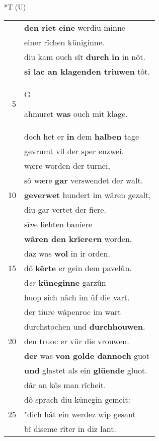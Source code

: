 \documentclass[8pt,a4paper,notitlepage]{article}
\begin{document}
\begin{table}[ht]
\begin{minipage}[t]{0.5\linewidth}
\end{minipage}
\hspace{0.5cm}
\begin{minipage}[t]{0.5\linewidth}
\small
\begin{center}*T (U)
\end{center}
\begin{tabular}{rl}
 & \textbf{den riet} \textbf{eine} werdiu minne\\ 
 & einer rîchen küniginne.\\ 
 & diu kam ouch sît \textbf{durch} \textbf{in} in nôt.\\ 
 & \textbf{si lac an klagenden triuwen} tôt.\\ 
5 & \begin{large}G\end{large}ahmuret \textbf{was} ouch mit klage.\\ 
 & doch het er \textbf{in} dem \textbf{halben} tage\\ 
 & gevrumt vil der sper enzwei.\\ 
 & wære worden der turnei,\\ 
 & sô wære \textbf{gar} verswendet der walt.\\ 
10 & \textbf{geverwet} hundert im wâren gezalt,\\ 
 & diu gar vertet der fiere.\\ 
 & sî\textit{n}e liehten baniere\\ 
 & \textbf{wâren den krîere\textit{r}n} worden.\\ 
 & daz was \textbf{wol} in ir orden.\\ 
15 & dô \textbf{kêrte} er gein dem pavelûn.\\ 
 & d\textit{er} \textbf{küneginne} garzûn\\ 
 & huop sich nâch im ûf die vart.\\ 
 & der tiure wâpenroc im wart\\ 
 & durchstochen und \textbf{durchhouwen}.\\ 
20 & den truoc er vür die vrouwen.\\ 
 & \textbf{der} was \textbf{von golde dannoch} guot\\ 
 & \textbf{und} glastet als ein \textbf{glüende} gluot.\\ 
 & dâr an kôs man rîcheit.\\ 
 & dô sprach diu künegin gemeit:\\ 
25 & "dich hât ein werdez wîp gesant\\ 
 & bî diseme rîter in diz lant.\\ 

\end{tabular}
\end{minipage}
\end{table}
\end{document}
